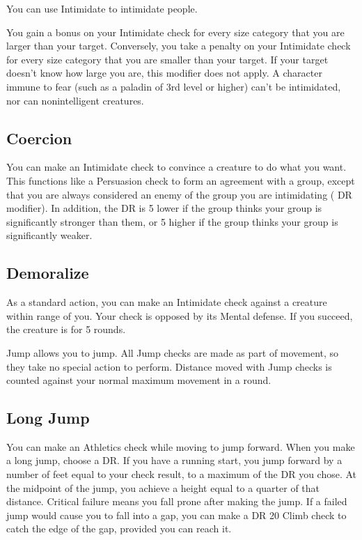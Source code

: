         You can use Intimidate to intimidate people.

        You gain a  bonus on your Intimidate check for every size category that you are larger than your target. Conversely, you take a  penalty on your Intimidate check for every size category that you are smaller than your target. If your target doesn't know how large you are, this modifier does not apply. A character immune to fear (such as a paladin of 3rd level or higher) can't be intimidated, nor can nonintelligent creatures.

    \subsection{Coercion}
        You can make an Intimidate check to convince a creature to do what you want. This functions like a Persuasion check to form an agreement with a group, except that you are always considered an enemy of the group you are intimidating ( DR modifier). In addition, the DR is 5 lower if the group thinks your group is significantly stronger than them, or 5 higher if the group thinks your group is significantly weaker.

    \subsection{Demoralize}\label{Demoralize}
        As a standard action, you can make an Intimidate check against a creature within \rngmed range of you. Your check is opposed by its Mental defense. If you succeed, the creature is \shaken for 5 rounds.

        Jump allows you to jump. All Jump checks are made as part of movement, so they take no special action to perform. Distance moved with Jump checks is counted against your normal maximum movement in a round.

    \subsection{Long Jump}
        You can make an Athletics check while moving to jump forward. When you make a long jump, choose a DR. If you have a running start, you jump forward by a number of feet equal to your check result, to a maximum of the DR you chose. At the midpoint of the jump, you achieve a height equal to a quarter of that distance. Critical failure means you fall prone after making the jump. If a failed jump would cause you to fall into a gap, you can make a DR 20 Climb check to catch the edge of the gap, provided you can reach it.

